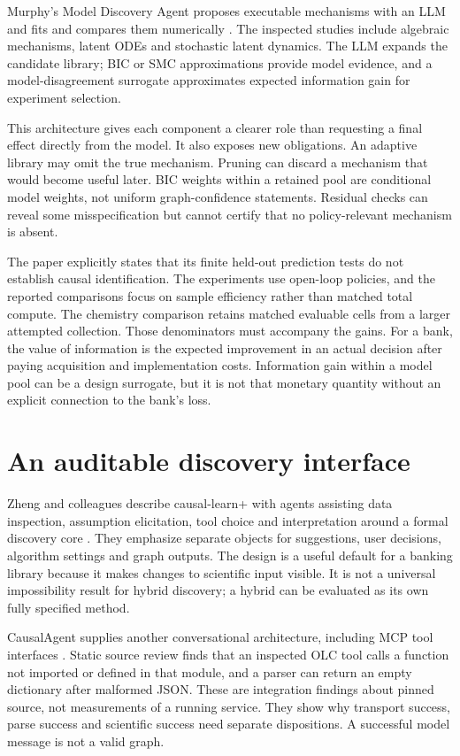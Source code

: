Murphy's Model Discovery Agent proposes executable mechanisms with an LLM and
fits and compares them numerically \citep{v12_la_2608_09696}. The inspected
studies include algebraic mechanisms, latent ODEs and stochastic latent
dynamics. The LLM expands the candidate library; BIC or SMC approximations
provide model evidence, and a model-disagreement surrogate approximates
expected information gain for experiment selection.

This architecture gives each component a clearer role than requesting a final
effect directly from the model. It also exposes new obligations. An adaptive
library may omit the true mechanism. Pruning can discard a mechanism that
would become useful later. BIC weights within a retained pool are conditional
model weights, not uniform graph-confidence statements. Residual checks can
reveal some misspecification but cannot certify that no policy-relevant
mechanism is absent.

The paper explicitly states that its finite held-out prediction tests do not
establish causal identification. The experiments use open-loop policies, and
the reported comparisons focus on sample efficiency rather than matched total
compute. The chemistry comparison retains matched evaluable cells from a
larger attempted collection. Those denominators must accompany the gains.
For a bank, the value of information is the expected improvement in an actual
decision after paying acquisition and implementation costs. Information gain
within a model pool can be a design surrogate, but it is not that monetary
quantity without an explicit connection to the bank's loss.

\section{An auditable discovery interface}

Zheng and colleagues describe causal-learn+ with agents assisting data
inspection, assumption elicitation, tool choice and interpretation around a
formal discovery core \citep{v12_la_2606_23608}. They emphasize separate
objects for suggestions, user decisions, algorithm settings and graph outputs.
The design is a useful default for a banking library because it makes changes
to scientific input visible. It is not a universal impossibility result for
hybrid discovery; a hybrid can be evaluated as its own fully specified method.

CausalAgent supplies another conversational architecture, including MCP tool
interfaces \citep{v12_la_2602_11527}. Static source review finds that an
inspected OLC tool calls a function not imported or defined in that module,
and a parser can return an empty dictionary after malformed JSON. These are
integration findings about pinned source, not measurements of a running
service. They show why transport success, parse success and scientific success
need separate dispositions. A successful model message is not a valid graph.

